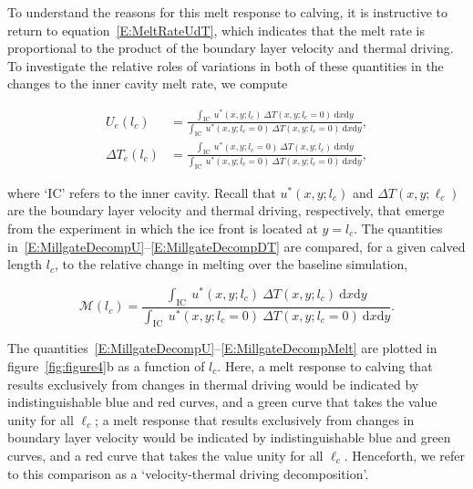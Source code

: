 \documentclass[draft]{agujournal2019}
\begin{document}
To understand the reasons for this melt response to calving, it is instructive to return to equation~\eqref{E:MeltRateUdT}, which indicates that the melt rate is proportional to the product of the boundary layer velocity and thermal driving. To investigate the relative roles of variations in both of these quantities in the changes to the inner cavity melt rate, we compute~\cite{Millgate2013JGROceans}
\begin{linenomath*}
\begin{align}
  U_{e}(l_c) &=  \frac{\int_{\text{IC}}~u^*(x,y; l_c)~\Delta T(x,y;l_c = 0)~\mathrm{d}x\mathrm{d}y}{\int_{\text{IC}}~ u^*(x,y; l_c = 0)~\Delta T(x,y;l_c = 0)~\mathrm{d}x\mathrm{d}y}, \label{E:MillgateDecompU}\\ \Delta T_{e}(l_c) &=  \frac{\int_{\text{IC}}~u^*(x,y; l_c=0)~\Delta T(x,y;l_c)~\mathrm{d}x\mathrm{d}y}{\int_{\text{IC}}~ u^*(x,y; l_c = 0)~\Delta T(x,y;l_c = 0)~\mathrm{d}x\mathrm{d}y}, \label{E:MillgateDecompDT}
\end{align}
\end{linenomath*}
where `IC' refers to the inner cavity. Recall that $u^*(x,y;l_c)$ and $\Delta T(x,y;\ell_c)$ are the boundary layer velocity and thermal driving, respectively, that emerge from the experiment in which the ice front is located at $y = l_c$. The quantities in~\eqref{E:MillgateDecompU}--\eqref{E:MillgateDecompDT} are compared, for a given calved length $l_c$, to the relative change in melting over the baseline simulation,
\begin{linenomath*}
 \begin{equation}\label{E:MillgateDecompMelt}
   \mathcal{M}(l_c) =  \frac{\int_{\text{IC}}~u^*(x,y; l_c)~\Delta T(x,y;l_c)~\mathrm{d}x\mathrm{d}y}{\int_{\text{IC}}~ u^*(x,y; l_c = 0)~\Delta T(x,y;l_c = 0)~\mathrm{d}x\mathrm{d}y}.
 \end{equation}
 \end{linenomath*}

The quantities~\eqref{E:MillgateDecompU}--\eqref{E:MillgateDecompMelt} are plotted in figure~\ref{fig:figure4}b as a function of $l_c$.  Here, a melt response to calving that results exclusively from changes in thermal driving would be indicated by indistinguishable blue and red curves, and a green curve that takes the value unity for all $\ell_c$;  a melt response that results exclusively from changes in boundary layer velocity would be indicated by indistinguishable blue and green curves, and a red curve that takes the value unity for all $\ell_c$. Henceforth, we refer to this comparison as a `velocity-thermal driving decomposition'. %
\end{document}
